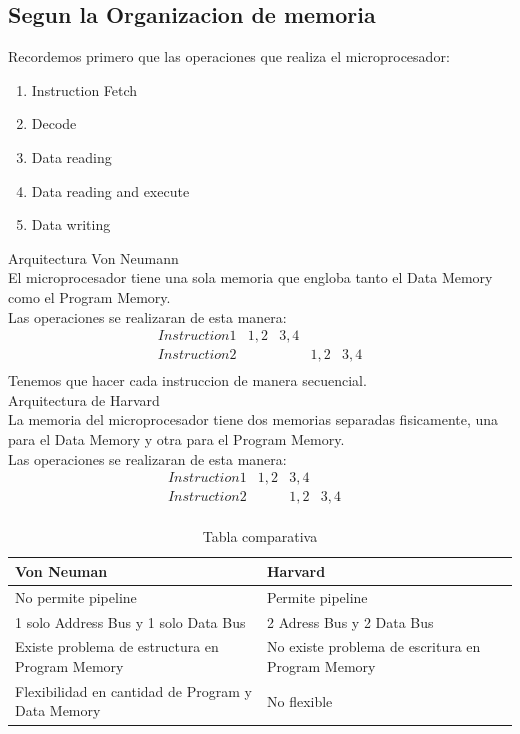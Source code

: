 \documentclass{report}
\begin{document}
\subsection{Segun la Organizacion de memoria}
Recordemos primero que las operaciones que realiza el microprocesador:
\begin{enumerate}
	\item Instruction Fetch
	\item Decode
	\item Data reading
	\item Data reading and execute
	\item Data writing
\end{enumerate}
{\large Arquitectura Von Neumann} \\
El microprocesador tiene una sola memoria que engloba tanto el Data Memory como el Program Memory. \\
Las operaciones se realizaran de esta manera:
\[
	\begin{array}{l|l|l|l|l}
		Instruction1 & 1,2 & 3,4 &     &     \\
		Instruction2 &     &     & 1,2 & 3,4 \\
	\end{array}
\]
Tenemos que hacer cada instruccion de manera secuencial. \\

{\large Arquitectura de Harvard} \\
La memoria del microprocesador tiene dos memorias separadas fisicamente, una para el Data Memory y otra para el Program Memory. \\
Las operaciones se realizaran de esta manera:
\[
	\begin{array}{l|l|l|l|l}
		Instruction1 & 1,2 & 3,4 &     & \\
		Instruction2 &     & 1,2 & 3,4 & \\
	\end{array}
\]
\newpage

\begin{table}[ht]
	\centering
	\begin{tabular}{p{0.5\linewidth}|p{0.5\linewidth}}
		Von Neuman                                        & Harvard                                           \\ \hline
		No permite pipeline                               & Permite pipeline                                  \\ \hline
		1 solo Address Bus y 1 solo Data Bus              & 2 Adress Bus y 2 Data Bus                         \\ \hline
		Existe problema de estructura en Program Memory   & No existe problema de escritura en Program Memory \\ \hline
		Flexibilidad en cantidad de Program y Data Memory & No flexible                                       \\
	\end{tabular}
	\caption{Tabla comparativa}
	\label{tab:clas_uP_org_mem}
\end{table}
\end{document}
